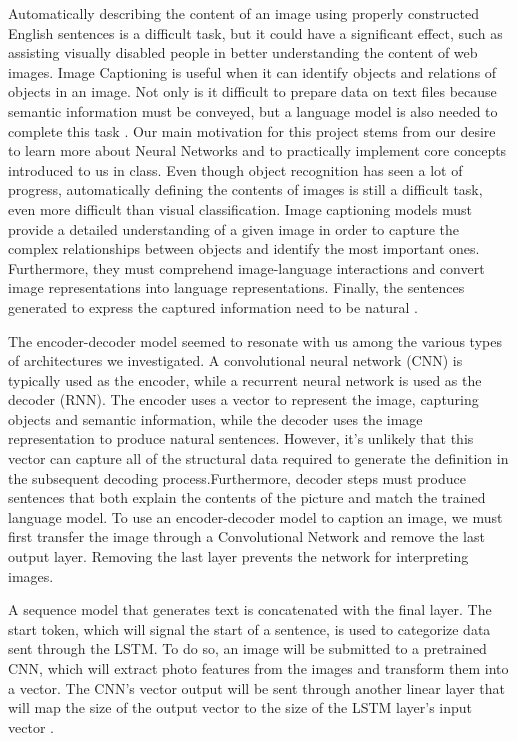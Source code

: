 \documentclass[conference]{IEEEtran}
\begin{document}
Automatically describing the content of an image using properly constructed English sentences is a difficult task, but it could have a significant effect, such as assisting visually disabled people in better understanding the content of web images. Image Captioning is useful when it can identify objects and relations of objects in an image. Not only is it difficult to prepare data on text files because semantic information must be conveyed, but a language model is also needed to complete this task \cite{b5}. Our main motivation for this project stems from our desire to learn more about Neural Networks and to practically implement core concepts introduced to us in class. Even though object recognition has seen a lot of progress, automatically defining the contents of images is still a difficult task, even more difficult than visual classification. Image captioning models must provide a detailed understanding of a given image in order to capture the complex relationships between objects and identify the most important ones. Furthermore, they must comprehend image-language interactions and convert image representations into language representations. Finally, the sentences generated to express the captured information need to be natural \cite{b6}.  

The encoder-decoder model seemed to resonate with us among the various types of architectures we investigated. A convolutional neural network (CNN) is typically used as the encoder, while a recurrent neural network is used as the decoder (RNN). The encoder uses a vector to represent the image, capturing objects and semantic information, while the decoder uses the image representation to produce natural sentences. However, it's unlikely that this vector can capture all of the structural data required to generate the definition in the subsequent decoding process.Furthermore, decoder steps must produce sentences that both explain the contents of the picture and match the trained language model. To use an encoder-decoder model to caption an image, we must first transfer the image through a Convolutional Network and remove the last output layer. Removing the last layer prevents the network for interpreting images. 

A sequence model that generates text is concatenated with the final layer. The start token, which will signal the start of a sentence, is used to categorize data sent through the LSTM. To do so, an image will be submitted to a pretrained CNN, which will extract photo features from the images and transform them into a vector. The CNN's vector output will be sent through another linear layer that will map the size of the output vector to the size of the LSTM layer's input vector \cite{b7}.
\end{document}
